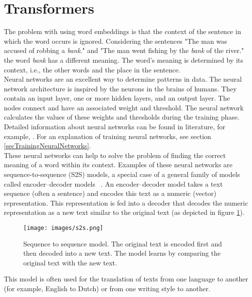 \section{Transformers}
The problem with using word embeddings is that the context of the sentence in which the word occurs is ignored. Considering the sentences "The man was accused of robbing a \textit{bank}." and "The man went fishing by the \textit{bank} of the river." the word \textit{bank} has a different meaning. The word's meaning is determined by its context, i.e., the other words and the place in the sentence. \\

Neural networks are an excellent way to determine patterns in data. The neural network architecture is inspired by the neurons in the brains of humans. They contain an input layer, one or more hidden layers, and an output layer. The nodes connect and have an associated weight and threshold. The neural network calculates the values of these weights and thresholds during the training phase. Detailed information about neural networks can be found in literature, for example, \citet{rao2019natural}. For an explanation of training neural networks, see section \ref{secTrainingNeuralNetworks}.\\

These neural networks can help to solve the problem of finding the correct meaning of a word within its context. Examples of these neural networks are sequence-to-sequence (S2S) models, a special case of a general family of models called encoder–decoder models ~\citep{boekh8}. An encoder–decoder model takes a text sequence (often a sentence) and encodes this text as a numeric (vector) representation. This representation is fed into a decoder that decodes the numeric representation as a new text similar to the original text (as depicted in figure \ref{imgs2s}). 

\begin{figure}[h]
\centering
\captionsetup{justification=centering}
\texttt{[image: images/s2s.png]}
\caption{Sequence to sequence model. The original text is encoded first and then decoded into a new text. The model learns by comparing the original text with the new text.}
\label{imgs2s}
\end{figure}

This model is often used for the translation of texts from one language to another (for example, English to Dutch) or from one writing style to another.\\


